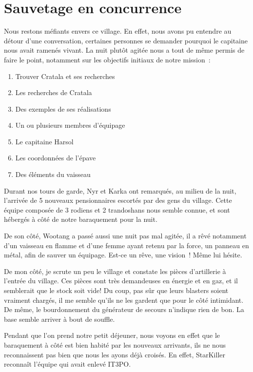 \documentclass[a4paper,9pt,twoside,twocolumn,openany]{book}
\begin{document}
\section{Sauvetage en concurrence}
\subtitle{27 novembre 2016}
Nous restons méfiants envers ce village. En effet, nous avons pu entendre au détour d’une conversation, certaines personnes se demander pourquoi le capitaine nous avait ramenés vivant.
La nuit plutôt agitée nous a tout de même permis de faire le point, notamment sur les objectifs initiaux de notre mission\ :

\begin{enumerate}
\item Trouver Cratala et ses recherches
\item Les recherches de Cratala
\item Des exemples de ses réalisations
\item Un ou plusieurs membres d’équipage
\item Le capitaine Harsol
\item Les coordonnées de l’épave
\item Des éléments du vaisseau
\end{enumerate}

Durant nos tours de garde, Nyr et Karka ont remarqués, au milieu de la nuit, l’arrivée de 5 nouveaux pensionnaires escortés par des gens du village. Cette équipe composée de 3 rodiens et 2 trandoshans nous semble connue, et sont hébergés à côté de notre baraquement pour la nuit.

De son côté, Wootang a passé aussi une nuit pas mal agitée, il a rêvé notamment d’un vaisseau en flamme et d’une femme ayant retenu par la force, un panneau en métal, afin de sauver un équipage. Est-ce un rêve, une vision\ ! Même lui hésite.

De mon côté, je scrute un peu le village et constate les pièces d’artillerie à l’entrée du village. Ces pièces sont très demandeuses en énergie et en gaz, et il semblerait que le stock soit vide! Du coup, pas sûr que leurs blasters soient vraiment chargés, il me semble qu’ils ne les gardent que pour le côté intimidant. De même, le bourdonnement du générateur de secours n’indique rien de bon. La base semble arriver à bout de souffle.

Pendant que l’on prend notre petit déjeuner, nous voyons en effet que le baraquement à côté est bien habité par les nouveaux arrivants, ils ne nous reconnaissent pas bien que nous les ayons déjà croisés. En effet, StarKiller reconnaît l’équipe qui avait enlevé IT3PO.
\end{document}
